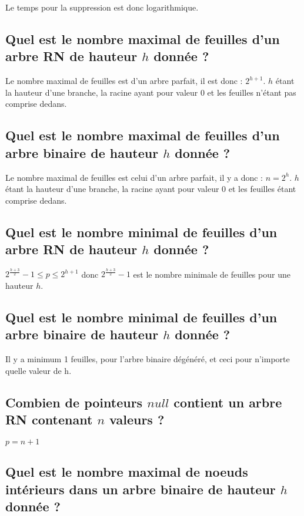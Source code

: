 \documentclass[11pt]{article}
\begin{document}
Le temps pour la suppression est donc logarithmique.

\subsection{Quel est le nombre maximal de feuilles d'un arbre RN de hauteur $h$ donnée ?}

Le nombre maximal de feuilles est d'un arbre parfait, il est donc : $2^{h+1}$. $h$ étant la hauteur d'une branche, la racine ayant pour valeur 0 et les feuilles n'étant pas comprise dedans.

\subsection{Quel est le nombre maximal de feuilles d'un arbre binaire de hauteur $h$ donnée ?}

Le nombre maximal de feuilles est celui d'un arbre parfait, il y a donc : $n = 2^h$. $h$ étant la hauteur d'une branche, la racine ayant pour valeur 0 et les feuilles étant comprise dedans.

\subsection{Quel est le nombre minimal de feuilles d'un arbre RN de hauteur $h$ donnée ?}

$2^{\frac{h+3}{2}} - 1 \leq p \leq 2^{h+1}$ donc $2^{\frac{h+3}{2}} - 1$ est le nombre minimale de feuilles pour une hauteur $h$.

\subsection{Quel est le nombre minimal de feuilles d'un arbre binaire de hauteur $h$ donnée ?}

Il y a minimum 1 feuilles, pour l'arbre binaire dégénéré, et ceci pour n'importe quelle valeur de h. 

\subsection{Combien de pointeurs $null$ contient un arbre RN contenant $n$ valeurs ?}

$p = n + 1$

\subsection{Quel est le nombre maximal de noeuds intérieurs dans un arbre binaire de hauteur $h$ donnée ?}
\end{document}
